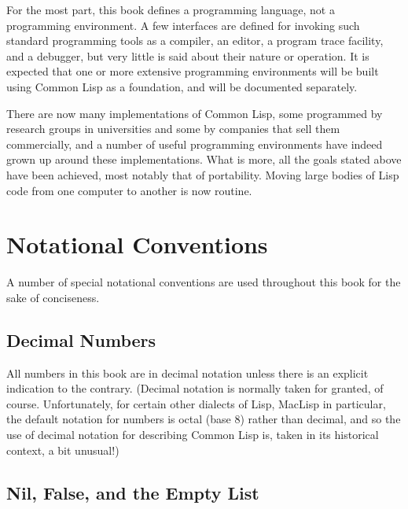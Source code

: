 For the most part, this book defines a programming language, not a
programming environment.  A few interfaces are defined for
invoking such standard programming tools as a compiler, an editor,
a program trace facility, and a debugger, but very little is said
about their nature or operation.  It is expected that one or more
extensive programming environments will be built using Common Lisp as a
foundation, and will be documented separately.

\begin{newer}
There are now many implementations of Common Lisp,
some programmed by research groups in universities
and some by companies that sell them commercially,
and a number of useful
programming environments have indeed grown up around
these implementations.
What is more, all the goals stated above have been achieved,
most notably that of portability.  Moving large bodies
of Lisp code from one computer to another is now routine.
\end{newer}

\section{Notational Conventions}

A number of special notational conventions are used throughout this book
for the sake of conciseness.

\subsection{Decimal Numbers}

All numbers in this book are in decimal notation unless
there is an explicit indication to the contrary.
(Decimal notation is normally taken for granted, of course.
Unfortunately, for certain other dialects of Lisp, MacLisp in particular,
the default notation for numbers is octal (base 8) rather than decimal,
and so the use of decimal notation for describing Common Lisp is,
taken in its historical context, a bit unusual!)

\subsection{Nil, False, and the Empty List}


